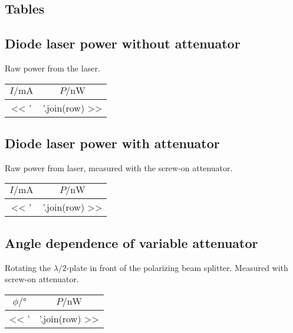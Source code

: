 \documentclass[11pt, english, fleqn, DIV=15, headinclude, BCOR=2cm]{scrreprt}
\begin{document}
\begin{appendix}
    \chapter{Tables}

    \section{Diode laser power without attenuator}

    Raw power from the laser.

    \begin{longtable}[l]{SS}
        \toprule
        {$I/\si{\milli\ampere}$}
        & {$P/\si{\nano\watt}$} \\
        \midrule
        \endhead
        << ' & '.join(row) >> \\
        \bottomrule
    \end{longtable}

    \section{Diode laser power with attenuator}

    Raw power from laser, measured with the screw-on attenuator.

    \begin{longtable}[l]{SS}
        \toprule
        {$I/\si{\milli\ampere}$}
        & {$P/\si{\nano\watt}$} \\
        \midrule
        \endhead
        << ' & '.join(row) >> \\
        \bottomrule
    \end{longtable}

    \section{Angle dependence of variable attenuator}
    \label{sec:variable_attenuator_table}

    Rotating the $\lambda/2$-plate in front of the polarizing beam splitter.
    Measured with screw-on attenuator.

    \begin{longtable}[l]{SS}
        \toprule
        {$\phi/\si{\degree}$}
        & {$P/\si{\nano\watt}$} \\
        \midrule
        \endhead
        << ' & '.join(row) >> \\
        \bottomrule
    \end{longtable}


\end{appendix}
\end{document}
